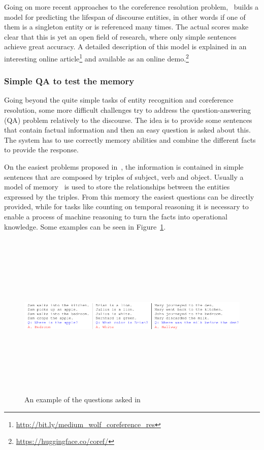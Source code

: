 Going on more recent approaches to the coreference resolution problem, \cite{de2015modeling}~builds a model  for predicting the lifespan of discourse entities, in other words if one of them is a singleton entity or is referenced many times. The actual scores make clear that this is yet an open field of research, where only simple sentences achieve great accuracy. A detailed description of this model is explained in an interesting online article\footnote{\url{http://bit.ly/medium_wolf_coreference_res}} and available as an online demo.\footnote{\url{https://huggingface.co/coref/}}

\subsubsection{Simple QA to test the memory}
Going beyond the quite simple tasks of entity recognition and coreference resolution, some more difficult challenges try to address the question-answering (QA) problem relatively to the discourse. The idea is to provide some sentences that contain factual information and then an easy question is asked about this. The system has to use correctly memory abilities and combine the different facts to provide the response.

On the easiest problems proposed in~\cite{weston2015towards}, the information is contained in simple sentences that are composed by triples of subject, verb and object. Usually a model of memory~\cite{sukhbaatar2015end} is used to store the relationships between the entities expressed by the triples. From this memory the easiest questions can be directly provided, while for tasks like counting on temporal reasoning it is necessary to enable a process of machine reasoning to turn the facts into operational knowledge. Some examples can be seen in Figure~\ref{fig:toyQuestionsMemory}.

\begin{figure}[!htb]
    \centering
    \includegraphics[max width=0.9\linewidth,max height=8cm,keepaspectratio]{figures/toyQuestionsMemory}
    \caption{An example of the questions asked in~\cite{weston2015towards}}\label{fig:toyQuestionsMemory}
\end{figure}


